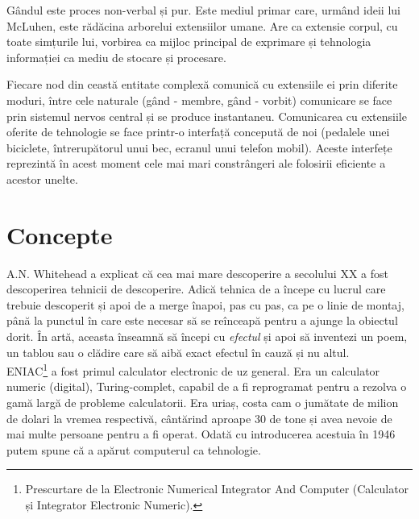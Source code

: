 Gândul este proces non-verbal și pur. Este mediul primar care, urmând ideii lui McLuhen, este rădăcina arborelui extensiilor umane. Are ca extensie corpul, cu toate simțurile lui, vorbirea ca mijloc principal de exprimare și tehnologia informației ca mediu de stocare și procesare.

Fiecare nod din ceastă entitate complexă comunică cu extensiile ei prin diferite moduri, între cele naturale (gând - membre, gând - vorbit) comunicare se face prin sistemul nervos central și se produce instantaneu. Comunicarea cu extensiile oferite de tehnologie se face printr-o interfață concepută de noi (pedalele unei biciclete, întrerupătorul unui bec, ecranul unui telefon mobil). Aceste interfețe reprezintă în acest moment cele mai mari constrângeri ale folosirii eficiente a acestor unelte.

\section{Concepte}

A.N. Whitehead a explicat că cea mai mare descoperire a secolului XX a fost descoperirea tehnicii de descoperire. Adică tehnica de a începe cu lucrul care trebuie descoperit și apoi de a merge înapoi, pas cu pas, ca pe o linie de montaj, până la punctul în care este necesar să se reînceapă pentru a ajunge la obiectul dorit. 
În artă, aceasta înseamnă să începi cu \textit{efectul} și apoi să inventezi un poem, un tablou sau o clădire care să aibă exact efectul în cauză și nu altul.\\

ENIAC\footnote{Prescurtare de la Electronic Numerical Integrator And Computer (Calculator și Integrator Electronic Numeric).} a fost primul calculator electronic de uz general. Era un calculator numeric (digital), Turing-complet, capabil de a fi reprogramat pentru a rezolva o gamă largă de probleme calculatorii.
Era uriaș, costa cam o jumătate de milion de dolari la vremea respectivă, cântărind aproape 30 de tone și avea nevoie de mai multe persoane pentru a fi operat. Odată cu introducerea acestuia în 1946 putem spune că a apărut computerul ca tehnologie. \\

